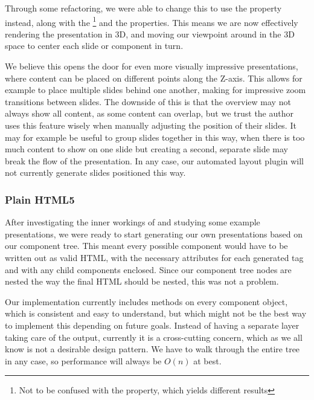      Through some refactoring, we were able to change this to use the
      property instead, along with the
     \footnote{Not to be confused with the
      property, which yields different results} and
     the  properties. This means we are now
     effectively rendering the presentation in 3D, and moving our viewpoint
     around in the 3D space to center each slide or component in turn.

     We believe this opens the door for even more visually impressive
     presentations, where content can be placed on different points along the
     Z-axis. This allows for example to place multiple slides behind one
     another, making for impressive zoom transitions between slides. The
     downside of this is that the overview may not always show all content, as
     some content can overlap, but we trust the author uses this feature wisely
     when manually adjusting the position of their slides. It may for example
     be useful to group slides together in this way, when there is too much
     content to show on one slide but creating a second, separate slide may
     break the flow of the presentation. In any case, our automated layout
     plugin will not currently generate slides positioned this way.

    \subsubsection{Plain HTML5}

     After investigating the inner workings of \mxp and studying some example
     presentations, we were ready to start generating our own presentations
     based on our component tree. This meant every possible component would
     have to be written out as valid HTML, with the necessary attributes for
     each generated tag and with any child components enclosed. Since our
     component tree nodes are nested the way the final HTML should be nested,
     this was not a problem.

     Our implementation currently includes  methods on every
     component object, which is consistent and easy to understand, but which
     might not be the best way to implement this depending on future goals.
     Instead of having a separate layer taking care of the output, currently it
     is a cross-cutting concern, which as we all know is not a desirable design
     pattern. We have to walk through the entire tree in any case, so
     performance will always be $O(n)$ at best.
    
